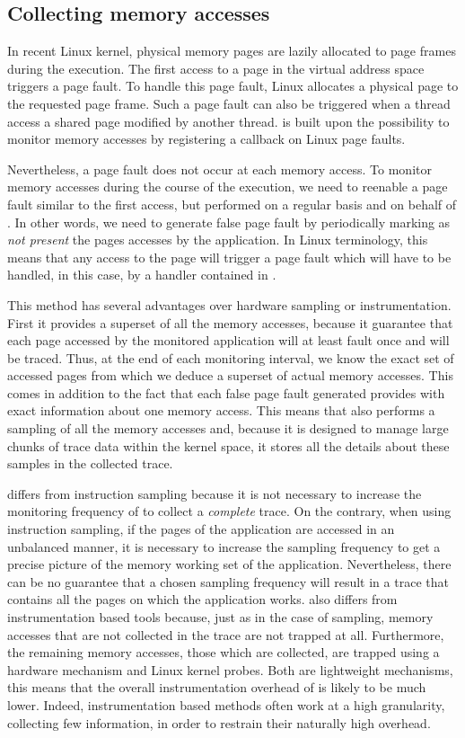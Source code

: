 \subsection{Collecting memory accesses}

In recent Linux kernel, physical memory pages are lazily allocated to page frames during
the execution. The first access to a page in the virtual address space triggers a page fault.
To handle this page fault, Linux allocates a physical page to the requested page frame.
Such a page fault can also be triggered when a thread access a shared page modified by
another thread. \Moca is built upon the possibility to monitor memory accesses by registering
a callback on Linux page faults.

Nevertheless, a page fault does not occur at each memory access. To monitor memory accesses during
the course of the execution, we need to reenable a page fault similar to the first access, but
performed on a regular basis and on behalf of \Moca.
In other words, we need to generate false page fault by periodically marking as \emph{not present}
the pages accesses by the application.
In Linux terminology, this means that any access to the page will trigger a page fault which
will have to be handled, in this case, by a handler contained in \Moca.

This method has several advantages over hardware sampling or
instrumentation. First it provides a superset of all the memory accesses, because it
guarantee that each page accessed by the monitored application will at least fault once
and will be traced. Thus, at the end of each monitoring interval, we know the exact set
of accessed pages from which we deduce a superset of actual memory accesses.
This comes in addition to the fact that each false page fault generated provides \Moca with
exact information about one memory access. This means that \Moca also performs a sampling
of all the memory accesses and, because it is designed to manage large chunks of trace data
within the kernel space, it stores all the details about these samples in the collected trace.

\Moca differs from instruction sampling because it is not necessary to increase the monitoring
frequency of \Moca to collect a \emph{complete} trace. On the contrary, when using instruction sampling,
if the pages of the application are accessed in an unbalanced manner, it is necessary to increase
the sampling frequency to get a precise picture of the memory working set of the application.
Nevertheless, there can be no guarantee that a chosen sampling frequency will result in a trace
that contains all the pages on which the application works.
\Moca also differs from instrumentation based tools because, just as in the case of sampling,
memory accesses that are not collected in the trace are not trapped at all. Furthermore, the
remaining memory accesses, those which are collected, are trapped using a hardware mechanism and
Linux kernel probes. Both are lightweight mechanisms, this means that
the overall instrumentation overhead of \Moca is likely to be much lower.
Indeed, instrumentation based methods often work at a high granularity, collecting few information,
in order to restrain their naturally high overhead.

